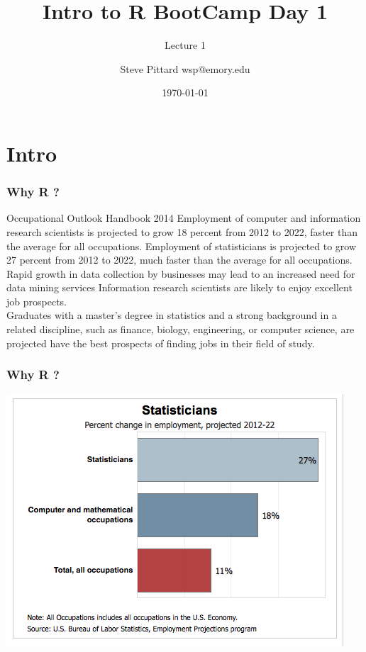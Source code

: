 \documentclass{beamer}
\begin{document}


\title{Intro to R BootCamp Day 1 }
\author{Steve Pittard wsp@emory.edu}
\subtitle{Lecture 1}
\date{\today}

\maketitle


\section{Intro}

\begin{frame}[fragile]
\frametitle{Why R ? }
\begin{block}{Occupational Outlook Handbook 2014}
Employment of computer and information research scientists is projected to grow 18 percent from 2012 to 2022, faster than the average for all occupations. Employment of statisticians is projected to grow 27 percent from 2012 to 2022, much faster than the average for all occupations. 
\newline
\\
Rapid growth in data collection by businesses may lead to an increased need for data mining services
Information research scientists are likely to enjoy excellent job prospects. 
\newline
\\
Graduates with a master's degree in statistics and a strong background in a related discipline, such as finance, biology, engineering, or computer science, are projected have the best prospects of finding jobs in their field of study.
\end{block}
\end{frame}


\begin{frame}[fragile]
\frametitle{Why R ? }
\begin{center}
\includegraphics{../IMG/statmath.png}
\end{center}
\end{frame}
\end{document}
